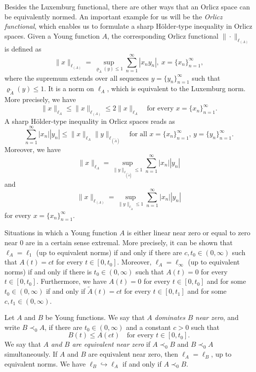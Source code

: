 \documentclass[nointlimits]{amsart}
\numberwithin{equation}{section}
\theoremstyle{plain}
\theoremstyle{definition}
\newcommand{\tA}{\tilde{A}}
\newcommand{\lA}{\ell_A}
\newcommand{\ltA}{\ell_{\tA}}
\newcommand{\lAOrl}{\ell_{(A)}}
\newcommand{\ltAOrl}{\ell_{(\tA)}}
\newcommand{\rtA}{\varrho_{\tilde{A}}}
\begin{document}
Besides the Luxemburg functional, there are other ways that an Orlicz space can be equivalently normed. An important example for us will be the \emph{Orlicz functional}, which enables us to formulate a sharp H\"{o}lder-type inequality in Orlicz spaces. Given a Young function $A$, the corresponding Orlicz functional $\|\cdot\|_{\lAOrl}$ is defined as
\begin{equation*}
   \|x\|_{\lAOrl} =  \sup_{\rtA(y)\leq 1} \sum_{n = 1}^\infty |x_n y_n|,\ x=\{x_n\}_{n=1}^\infty,
\end{equation*}
where the supremum extends over all sequences $y=\{y_n\}_{n=1}^\infty$ such that $\rtA(y)\leq1$. It is a norm on $\lA$, which is equivalent to the Luxemburg norm. More precisely, we have
\begin{equation}\label{prel:Orlicz_and_Lux_equiv}
    \|x\|_{\lA} \leq \|x\|_{\lAOrl} \leq 2 \|x\|_{\lA} \quad \text{for every $x=\{x_n\}_{n=1}^\infty$}.
\end{equation}
A sharp H\"{o}lder-type inequality in Orlicz spaces reads as
\begin{equation*}
    \sum_{n = 1}^\infty |x_n| |y_n| \leq \|x\|_{\lA} \|y\|_{\ltAOrl} \quad \text{for all $x=\{x_n\}_{n=1}^\infty$, $y=\{y_n\}_{n=1}^\infty$}.
\end{equation*}
Moreover, we have
\begin{equation}\label{prel:asoc_double_Lux}
    \|x\|_{\lA}  = \sup_{\|y\|_{\ltAOrl}\leq1} \sum_{n=1}^\infty |x_n||y_n|
\end{equation}
and
\begin{equation}\label{prel:asoc_double_Orl}
    \|x\|_{\lAOrl}  = \sup_{\|y\|_{\ltA}\leq1} \sum_{n=1}^\infty |x_n||y_n|
\end{equation}
for every $x=\{x_n\}_{n=1}^\infty$.

Situations in which a Young function $A$ is either linear near zero or equal to zero near $0$ are in a certain sense extremal. More precisely, it can be shown that $\lA = \ell_1$ (up to equivalent norms) if and only if there are $c, t_0\in(0, \infty)$ such that $A(t) = ct$ for every $t\in[0, t_0]$. Moreover, $\lA = \ell_\infty$ (up to equivalent norms) if and only if there is $t_0\in(0, \infty)$ such that $A(t) = 0$ for every $t\in[0, t_0]$. Furthermore, we have $A(t) = 0$ for every $t\in[0, t_0]$ and for some $t_0\in(0, \infty)$ if and only if $\tA(t) = ct$ for every $t\in[0, t_1]$ and for some $c,t_1\in(0, \infty)$.

Let $A$ and $B$ be Young functions. We say that \emph{$A$ dominates $B$ near zero}, and write $B\prec_0 A$, if there are $t_0\in(0,\infty)$ and a constant $c>0$ such that
\begin{equation*}
    B(t) \leq A(ct) \quad \text{for every $t\in[0, t_0]$}.
\end{equation*}
We say that \emph{$A$ and $B$ are equivalent near zero} if $A\prec_0 B$ and $B\prec_0 A$ simultaneously. If $A$ and $B$ are equivalent near zero, then $\lA = \ell_B$, up to equivalent norms. We have $\ell_B \hookrightarrow \lA$ if and only if $A\prec_0 B$.
\end{document}
